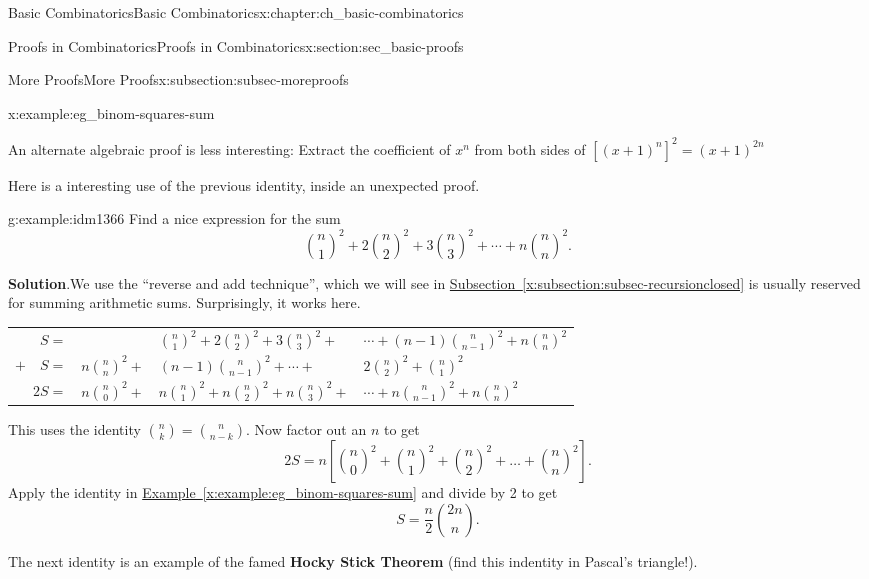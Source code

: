 \documentclass[oneside,10pt,]{book}
\newcommand{\terminology}[1]{\textbf{#1}}
\numberwithin{equation}{chapter}
\newcommand{\hrulethin}  {\noalign{\hrule height 0.04em}}
\begin{document}
\begin{chapterptx}{Basic Combinatorics}{}{Basic Combinatorics}{}{}{x:chapter:ch_basic-combinatorics}
\begin{sectionptx}{Proofs in Combinatorics}{}{Proofs in Combinatorics}{}{}{x:section:sec_basic-proofs}
\begin{subsectionptx}{More Proofs}{}{More Proofs}{}{}{x:subsection:subsec-moreproofs}
\begin{example}{}{x:example:eg_binom-squares-sum}
\par
An alternate algebraic proof is less interesting: Extract the coefficient of \(x^{n}\) from both sides of \(\left\lbrack \left( x + 1 \right)^{n} \right\rbrack^{2} = \left(x + 1 \right)^{2n}\)%
\end{example}
Here is a interesting use of the previous identity, inside an unexpected proof.%
\begin{example}{}{g:example:idm1366}%
Find a nice expression for the sum%
\begin{equation*}
\binom{n}{1}^2 + 2 \binom{n}{2}^2 + 3 \binom{n}{3}^2 + \cdots + n\binom{n}{n}^2\text{.}
\end{equation*}
%
\par\smallskip%
\noindent\textbf{Solution}.\hypertarget{g:solution:idm1370}{}\quad{}We use the ``reverse and add technique'', which we will see in \hyperref[x:subsection:subsec-recursionclosed]{Subsection~\ref{x:subsection:subsec-recursionclosed}} is usually reserved for summing arithmetic sums.  Surprisingly, it works here.%
\begin{sidebyside}{1}{0}{0}{0}%
\begin{sbspanel}{1}%
{\centering%
\begin{tabular}{rlll}
\(S  =\)&&\(\binom{n}{1}^2+2\binom{n}{2}^2+3\binom{n}{3}^2 + \)&\(\cdots +(n-1)\binom{n}{n-1}^2+n\binom{n}{n}^2\)\tabularnewline[0pt]
\(+ \quad S  =\)&\(n\binom{n}{n}^2 + \)&\((n-1)\binom{n}{n-1}^2+ \cdots +\)&\(2\binom{n}{2}^2+\binom{n}{1}^2\)\tabularnewline\hrulethin
\(2S  =\)&\(n\binom{n}{0}^2 + \)&\(n\binom{n}{1}^2 + n\binom{n}{2}^2+ n\binom{n}{3}^2 + \)&\(\cdots + n\binom{n}{n-1}^2+n\binom{n}{n}^2\)
\end{tabular}
\par}
\end{sbspanel}%
\end{sidebyside}%
\par
This uses the identity \(\binom{n}{k} = \binom{n}{n-k}\).  Now factor out an \(n\) to get%
\begin{equation*}
2S = n\left[\binom{n}{0}^{2} + \binom{n}{1}^{2} + \binom{n}{2}^{2} + \ldots + \binom{n}{n}^{2}\right]\text{.}
\end{equation*}
Apply the identity in \hyperref[x:example:eg_binom-squares-sum]{Example~\ref{x:example:eg_binom-squares-sum}} and divide by 2 to get%
\begin{equation*}
S = \frac{n}{2}\binom{2n}{n}\text{.}
\end{equation*}
%
\end{example}
The next identity is an example of the famed \terminology{Hocky Stick Theorem} (find this indentity in Pascal's triangle!).%

\end{subsectionptx}
\end{sectionptx}
\end{chapterptx}
\end{document}

